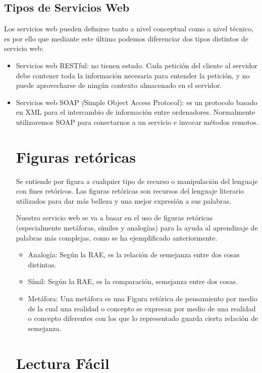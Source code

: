 \subsection{Tipos de Servicios Web}
\label{cap:subsec:serviciosweb}
Los servicios web pueden definirse tanto a nivel conceptual como a nivel técnico, es por ello que mediante este último podemos diferenciar dos tipos distintos de servicio web:
\begin{itemize}
\item Servicios web RESTful: no tienen estado. Cada petición del cliente al servidor debe contener toda la información necesaria para entender la petición, y no puede aprovecharse de ningún contexto almacenado en el servidor.
\item Servicios web SOAP  \textit({Simple Object Access Protocol}): es un protocolo basado en XML para el intercambio de información entre ordenadores. Normalmente utilizaremos SOAP para conectarnos a un servicio e invocar métodos remotos.



\section{Figuras retóricas}
Se entiende por figura a cualquier tipo de recurso o manipulación del lenguaje con fines retóricos.
Las figuras retóricas son recursos del lenguaje literario utilizados para dar más belleza y una mejor expresión a sus palabras.

Nuestro servicio web se va a basar en el uso de figuras retóricas (especialmente metáforas, símiles y analogías) para la ayuda al aprendizaje de palabras más complejas, como se ha ejemplificado anteriormente.

\begin{itemize}
\item Analogía: Según la RAE, es la relación de semejanza entre dos cosas distintas.
\item Símil: Según la RAE, es la comparación, semejanza entre dos cosas.
\item Metáfora: Una metáfora es una Figura retórica de pensamiento por medio de la cual una realidad o concepto se expresan por medio de una realidad o concepto diferentes con los que lo representado guarda cierta relación de semejanza.
\end{itemize}



\section{Lectura Fácil}


\end{itemize}
